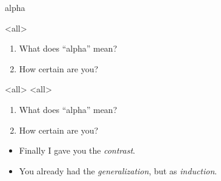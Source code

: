 \begin{frame}
  \begin{center}
    \huge
    alpha
  \end{center}
\end{frame}

\mode<all>{}

\begin{frame}
  \begin{question}
    \begin{enumerate}
      \item What does \enquote{alpha} mean?
      \item How certain are you?
    \end{enumerate}
  \end{question}
\end{frame}

\mode<all>{}
\mode<all>{}

\begin{frame}
  \begin{question}[Again]
    \begin{enumerate}
      \item What does \enquote{alpha} mean?
      \item How certain are you?
    \end{enumerate}
  \end{question}
\end{frame}

\begin{frame}
  \begin{remark}
    \begin{itemize}
      \item Finally I gave you the \emph{contrast}.
      \item You already had the \emph{generalization}, but as \emph{induction}.
    \end{itemize}
  \end{remark}
\end{frame}

